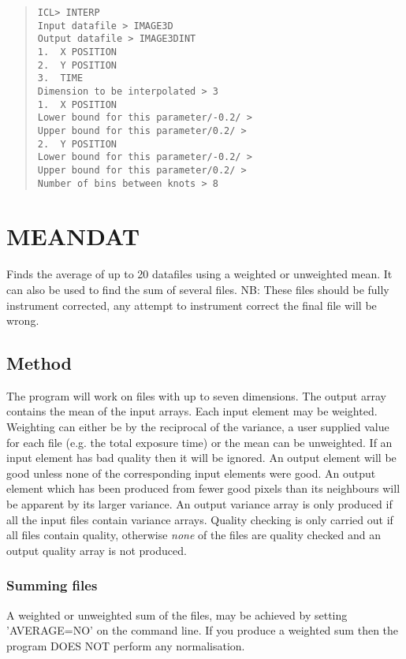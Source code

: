 \documentclass{book}
\renewcommand{\_}{{\tt\char'137}}     %
\begin{document}
\begin{quote}\begin{verbatim}
ICL> INTERP
Input datafile > IMAGE3D
Output datafile > IMAGE3DINT
1.  X POSITION
2.  Y POSITION
3.  TIME
Dimension to be interpolated > 3
1.  X POSITION
Lower bound for this parameter/-0.2/ >
Upper bound for this parameter/0.2/ >
2.  Y POSITION
Lower bound for this parameter/-0.2/ >
Upper bound for this parameter/0.2/ >
Number of bins between knots > 8
\end{verbatim}\end{quote}
\section{MEANDAT}
Finds the average of up to 20 datafiles using a weighted or
unweighted mean. It can also be used to find the sum of several files.
NB: These files should be fully instrument corrected, any attempt to
instrument correct the final file will be wrong.
\subsection{Method}
The program will work on files with up to seven dimensions.
The output array contains the mean of the input arrays. Each input
element may be weighted.
Weighting can either be by the reciprocal of the variance, a user
supplied value for each file (e.g. the total exposure time) or
the mean can be unweighted. If an input element has bad quality then
it will be ignored. An output element will be good unless none of the
corresponding input elements were good. An output element which has
been produced from fewer good pixels than its neighbours will be
apparent by its larger variance. An output variance array is only
produced if all the input files contain variance arrays. Quality
checking is only carried out if all files contain quality, otherwise
{\em none} of the files are quality checked and an output quality array is
not produced.

\subsubsection{Summing files}
A weighted or unweighted sum of the files, may be achieved by
setting 'AVERAGE=NO' on the command line. If you produce a weighted
sum then the program DOES NOT perform any normalisation.
\end{document}
